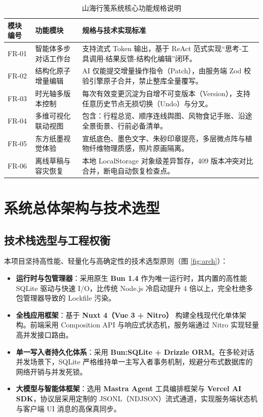 \documentclass[11pt,a4paper,UTF8]{ctexart}
\begin{document}
\begin{table}[htbp]
\centering
\small
\caption{山海行笺系统核心功能规格说明}
\label{tab:functional_req}
\begin{tabularx}{\textwidth}{lp{3.5cm}X}
\toprule
\textbf{模块编号} & \textbf{功能模块} & \textbf{规格与技术实现标准} \\
\midrule
FR-01 & 智能体多步对话工作台 & 支持流式 Token 输出，基于 ReAct 范式实现“思考-工具调用-结果反馈-结构化编辑”闭环。 \\
FR-02 & 结构化原子增量编辑 & AI 仅能提交增量操作指令（Patch），由服务端 Zod 校验引擎原子合并，禁止整库全量覆写。 \\
FR-03 & 时光轴多版本控制 & 每次有效变更沉淀为自增不可变版本（Version），支持任意历史节点无损切换（Undo）与分叉。 \\
FR-04 & 多维可视化联动视图 & 包含：行程总览、顺序连线舆图、风物食记手账、沿途全景街景、行前必备清单。 \\
FR-05 & 东方纸墨视觉体验 & 宣纸底色、墨色文字、朱砂印章提亮，多层微点阵与植物纤维物理质感，照片原画隔离。 \\
FR-06 & 离线草稿与容灾恢复 & 本地 LocalStorage 对象级差异暂存，409 版本冲突对比合并，断电自动恢复检查点。 \\
\bottomrule
\end{tabularx}
\end{table}

\section{系统总体架构与技术选型}

\subsection{技术栈选型与工程权衡}
本项目坚持高性能、轻量化与高确定性的技术选型原则（图 \ref{fig:arch}）：
\begin{itemize}
    \item \textbf{运行时与包管理器}：采用原生 \textbf{Bun 1.4} 作为唯一运行时，其内置的高性能 SQLite 驱动与快速 I/O，比传统 Node.js 冷启动提升 4 倍以上，完全杜绝多包管理器导致的 Lockfile 污染。
    \item \textbf{全栈应用框架}：基于 \textbf{Nuxt 4（Vue 3 + Nitro）} 构建全栈现代化单体架构。前端采用 Composition API 与响应式状态机，服务端通过 Nitro 实现轻量高并发接口路由。
    \item \textbf{单一写入者持久化体系}：采用 \textbf{Bun:SQLite + Drizzle ORM}。在多轮对话并发场景下，SQLite 严格维持单一主写入者事务机制，规避分布式数据库的网络开销与并发死锁。
    \item \textbf{大模型与智能体框架}：选用 \textbf{Mastra Agent} 工具编排框架与 \textbf{Vercel AI SDK}，协议层采用定制的 JSONL（NDJSON）流式通道，实现服务端状态机与客户端 UI 消息的高保真同步。
\end{itemize}
\end{document}
